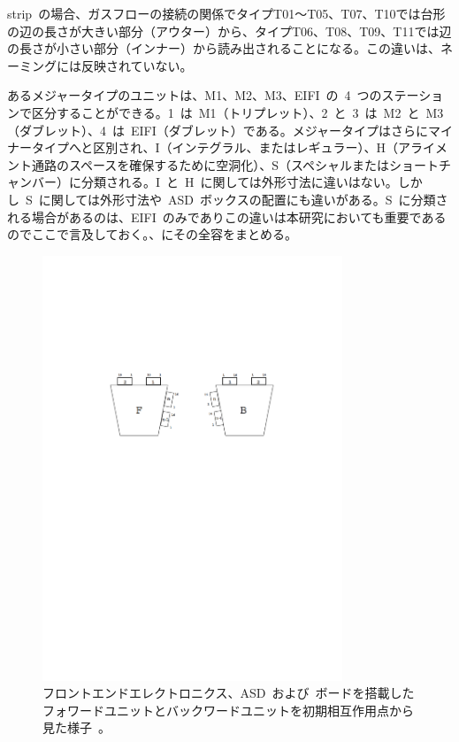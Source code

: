 strip~の場合、ガスフローの接続の関係でタイプT01～T05、T07、T10では台形の辺の長さが大きい部分（アウター）から、タイプT06、T08、T09、T11では辺の長さが小さい部分（インナー）から読み出されることになる。この違いは、ネーミングには反映されていない。

あるメジャータイプのユニットは、M1、M2、M3、EIFI~の~4~つのステーションで区分することができる。1~は~M1（トリプレット）、2~と~3~は~M2~と~M3（ダブレット）、4~は~EIFI（ダブレット）である。メジャータイプはさらにマイナータイプへと区別され、I（インテグラル、またはレギュラー）、H（アライメント通路のスペースを確保するために空洞化）、S（スペシャルまたはショートチャンバー）に分類される。I~と~H~に関しては外形寸法に違いはない。しかし~S~に関しては外形寸法や~ASD~ボックスの配置にも違いがある。S~に分類される場合があるのは、EIFI~のみでありこの違いは本研究においても重要であるのでここで言及しておく。、にその全容をまとめる。

\begin{figure}[h]
        \centering   
        \includegraphics[width=0.8\textwidth,page=1]{img/pdf/TGC.pdf}
        \caption[フロントエンドエレクトロニクス、ASD~および~ボードを搭載したフォワードユニットとバックワードユニット]{フロントエンドエレクトロニクス、ASD~および~ボードを搭載したフォワードユニットとバックワードユニットを初期相互作用点から見た様子~\cite{TR:02}。}
        \label{fig:tgcBF}
\end{figure}

